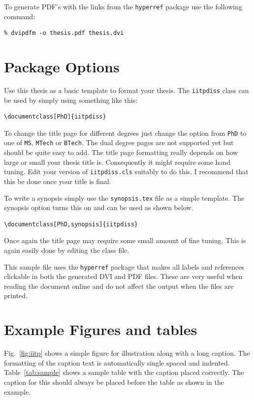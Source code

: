\documentclass[BTech]{iitpdiss}
\begin{document}
To generate PDF's with the links from the \verb+hyperref+ package use
the following command:
\begin{verbatim}
% dvipdfm -o thesis.pdf thesis.dvi
\end{verbatim}

\section{Package Options}

Use this thesis as a basic template to format your thesis.  The
\verb+iitpdiss+ class can be used by simply using something like this:
\begin{verbatim}
\documentclass[PhD]{iitpdiss}  
\end{verbatim}

To change the title page for different degrees just change the option
from \verb+PhD+ to one of \verb+MS+, \verb+MTech+ or \verb+BTech+.
The dual degree pages are not supported yet but should be quite easy
to add.  The title page formatting really depends on how large or
small your thesis title is.  Consequently it might require some hand
tuning.  Edit your version of \verb+iitpdiss.cls+ suitably to do this.
I recommend that this be done once your title is final.

To write a synopsis simply use the \verb+synopsis.tex+ file as a
simple template.  The synopsis option turns this on and can be used as
shown below.
\begin{verbatim}
\documentclass[PhD,synopsis]{iitpdiss}                                
\end{verbatim}

Once again the title page may require some small amount of fine
tuning.  This is again easily done by editing the class file.

This sample file uses the \verb+hyperref+ package that makes all
labels and references clickable in both the generated DVI and PDF
files.  These are very useful when reading the document online and do
not affect the output when the files are printed.


\section{Example Figures and tables}

Fig.~\ref{fig:iitp} shows a simple figure for illustration along with
a long caption.  The formatting of the caption text is automatically
single spaced and indented.  Table~\ref{tab:sample} shows a sample
table with the caption placed correctly.  The caption for this should
always be placed before the table as shown in the example.
\end{document}
